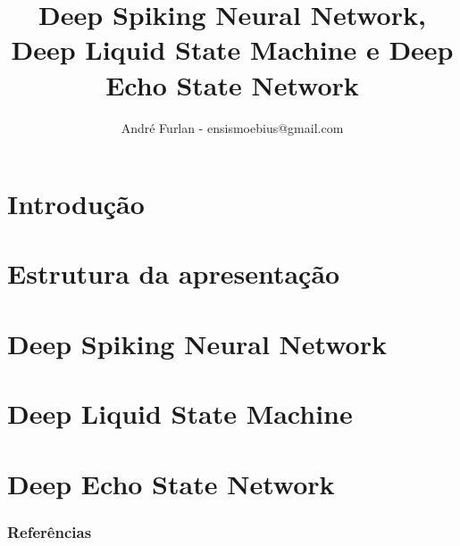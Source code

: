 

\title{Deep Spiking Neural Network, Deep Liquid	State Machine e Deep Echo State Network}


\author{André Furlan - ensismoebius@gmail.com}

\date{\the\year}


	
	\frame{\titlepage}
	
	\section{Introdução}
		

	\section{Estrutura da apresentação}
		

	\section{Deep Spiking Neural Network}
		
	\section{Deep Liquid State Machine}
		
	\section{Deep Echo State Network}
		
	
	\begin{frame}[allowframebreaks]
		\frametitle{Referências}
		
	\end{frame}
	
